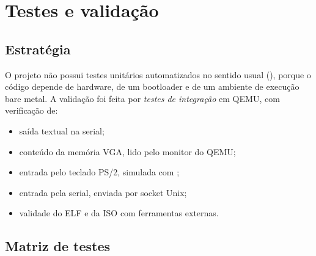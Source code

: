 \chapter{Testes e valida\c{c}\~ao}
\label{cap:testes}

\section{Estrat\'egia}

O projeto n\~ao possui testes unit\'arios automatizados no sentido usual
(), porque o c\'odigo depende de hardware, de um bootloader
e de um ambiente de execu\c{c}\~ao bare metal. A valida\c{c}\~ao foi feita por
\emph{testes de integra\c{c}\~ao} em QEMU, com verifica\c{c}\~ao de:

\begin{itemize}
  \item sa\'ida textual na serial;
  \item conte\'udo da mem\'oria VGA, lido pelo monitor do QEMU;
  \item entrada pelo teclado PS/2, simulada com ;
  \item entrada pela serial, enviada por socket Unix;
  \item validade do ELF e da ISO com ferramentas externas.
\end{itemize}

\section{Matriz de testes}

